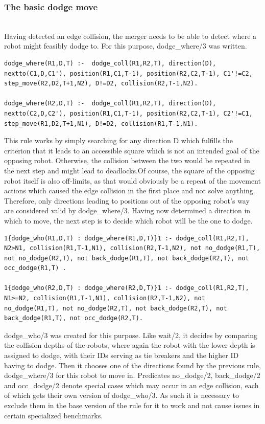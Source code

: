 \documentclass{llncs}
\begin{document}
\subsubsection{The basic dodge move}\hfill\\
Having detected an edge collision, the merger needs to be able to detect where a robot might feasibly dodge to. For this purpose, dodge\_where/3 was written.
\begin{lstlisting}[basicstyle=\fontsize{9}{11}\selectfont\ttfamily,frame=single,breaklines=true]
dodge_where(R1,D,T) :-  dodge_coll(R1,R2,T), direction(D), nextto(C1,D,C1'), position(R1,C1,T-1), position(R2,C2,T-1), C1'!=C2, step_move(R2,D2,T+1,N2), D!=D2, collision(R2,T-1,N2).

dodge_where(R2,D,T) :-  dodge_coll(R1,R2,T), direction(D), nextto(C2,D,C2'), position(R1,C1,T-1), position(R2,C2,T-1), C2'!=C1, step_move(R1,D2,T+1,N1), D!=D2, collision(R1,T-1,N1).
\end{lstlisting}
This rule works by simply searching for any direction D which fulfills the criterion that it leads to an accessible square which is not an intended goal of the opposing robot. Otherwise, the collision between the two would be repeated in the next step and might lead to deadlocks.\newline Of course, the square of the opposing robot itself is also off-limits, as that would obviously be a repeat of the movement actions which caused the edge collision in the first place and not solve anything. Therefore, only directions leading to positions out of the opposing robot's way are considered valid by dodge\_where/3. \newline\newline
Having now determined a direction in which to move, the next step is to decide which robot will be the one to dodge.
\begin{lstlisting}[basicstyle=\fontsize{9}{11}\selectfont\ttfamily,frame=single,breaklines=true]
1{dodge_who(R1,D,T) : dodge_where(R1,D,T)}1 :- dodge_coll(R1,R2,T), N2>N1, collision(R1,T-1,N1), collision(R2,T-1,N2), not no_dodge(R1,T), not no_dodge(R2,T), not back_dodge(R1,T), not back_dodge(R2,T), not occ_dodge(R1,T) .

1{dodge_who(R2,D,T) : dodge_where(R2,D,T)}1 :- dodge_coll(R1,R2,T), N1>=N2, collision(R1,T-1,N1), collision(R2,T-1,N2), not no_dodge(R1,T), not no_dodge(R2,T), not back_dodge(R2,T), not back_dodge(R1,T), not occ_dodge(R2,T).
\end{lstlisting}
dodge\_who/3 was created for this purpose. Like wait/2, it decides by comparing the collision depths of the robots, where again the robot with the lower depth is assigned to dodge, with their IDs serving as tie breakers and the higher ID having to dodge. \newline Then it chooses one of the directions found by the previous rule, dodge\_where/3 for this robot to move in. Predicates no\_dodge/2, back\_dodge/2 and occ\_dodge/2 denote special cases which may occur in an edge collision, each of which gets their own version of dodge\_who/3. As such it is necessary to exclude them in the base version of the rule for it to work and not cause issues in certain specialized benchmarks.\newline\newline
\end{document}
